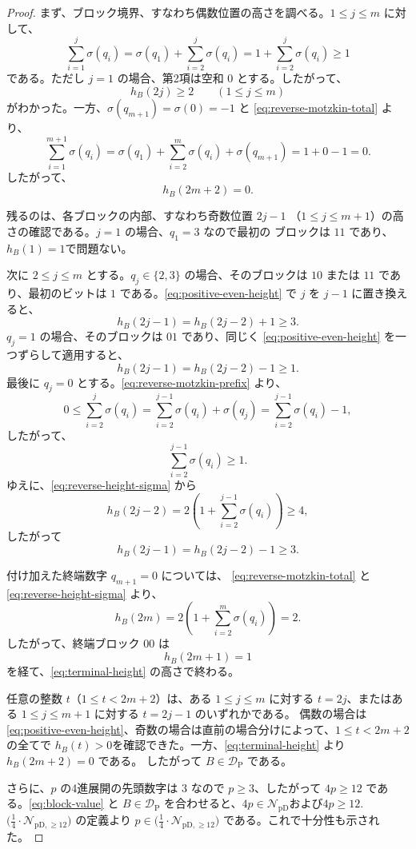 \documentclass[12pt]{ltjsarticle}
\theoremstyle{plain}
\theoremstyle{definition}
\theoremstyle{plain}
\newcommand{\NpD}{\mathcal{N}_{\mathrm{pD}}}
\newcommand{\DP}{\mathcal{D}_{\mathrm{P}}}
\newcommand{\Pset}{%
  \bigl(\tfrac{1}{4}\cdot\mathcal{N}_{\mathrm{pD},\geq 12}\bigr)%
}
\begin{document}
\begin{proof}
まず、ブロック境界、すなわち偶数位置の高さを調べる。$1\leq j\leq m$ に対して、
\[
 \sum_{i=1}^{j}\sigma(q_i)
 = \sigma(q_1)+\sum_{i=2}^{j}\sigma(q_i)
=1+\sum_{i=2}^{j}\sigma(q_i)
 \geq1
\]
である。ただし $j=1$ の場合、第2項は空和 $0$ とする。したがって、
\begin{equation}\label{eq:positive-even-height}
 h_B(2j)\geq2
 \qquad(1\leq j\leq m)
\end{equation}
がわかった。一方、$\sigma(q_{m+1})=\sigma(0)=-1$ と
\eqref{eq:reverse-motzkin-total} より、
\[
 \sum_{i=1}^{m+1}\sigma(q_i)
 = \sigma(q_1)+\sum_{i=2}^{m}\sigma(q_i)+\sigma(q_{m+1})
 =1+0-1=0.
\]
したがって、
\begin{equation}\label{eq:terminal-height}
 h_B(2m+2)=0.
\end{equation}

残るのは、各ブロックの内部、すなわち奇数位置 $2j-1$
（$1\leq j\leq m+1$）の高さの確認である。$j=1$ の場合、$q_1=3$ なので最初の
ブロックは $11$ であり、$ h_B(1)=1$で問題ない。

次に $2\leq j\leq m$ とする。$q_j\in\{2,3\}$ の場合、そのブロックは $10$ または
$11$ であり、最初のビットは $1$ である。\eqref{eq:positive-even-height} で $j$ を
$j-1$ に置き換えると、
\[
 h_B(2j-1)=h_B(2j-2)+1\geq3.
\]
$q_j=1$ の場合、そのブロックは $01$ であり、同じく
\eqref{eq:positive-even-height} を一つずらして適用すると、
\[
 h_B(2j-1)=h_B(2j-2)-1\geq1.
\]
最後に $q_j=0$ とする。\eqref{eq:reverse-motzkin-prefix} より、
\[
 0\leq\sum_{i=2}^{j}\sigma(q_i)
 =\sum_{i=2}^{j-1}\sigma(q_i)+\sigma(q_j)=\sum_{i=2}^{j-1}\sigma(q_i)-1,
\]
したがって、
\[
 \sum_{i=2}^{j-1}\sigma(q_i)\geq1.
\]
ゆえに、\eqref{eq:reverse-height-sigma} から
\[
 h_B(2j-2)
 =2\left(1+\sum_{i=2}^{j-1}\sigma(q_i)\right)
 \geq4,
\]
したがって
\[
 h_B(2j-1)=h_B(2j-2)-1\geq3.
\]

付け加えた終端数字 $q_{m+1}=0$ については、
\eqref{eq:reverse-motzkin-total} と \eqref{eq:reverse-height-sigma} より、
\[
 h_B(2m)=2\left(1+\sum_{i=2}^{m}\sigma(q_i)\right)=2.
\]
したがって、終端ブロック $00$ は
\[
 h_B(2m+1)=1
\]
を経て、\eqref{eq:terminal-height} の高さで終わる。

任意の整数 $t$（$1\leq t<2m+2$）は、ある $1\leq j\leq m$ に対する
$t=2j$、またはある $1\leq j\leq m+1$ に対する $t=2j-1$ のいずれかである。
偶数の場合は \eqref{eq:positive-even-height}、奇数の場合は直前の場合分けによって、$1\leq t<2m+2$の全てで
$ h_B(t)>0$を確認できた。一方、\eqref{eq:terminal-height} より $h_B(2m+2)=0$ である。
したがって $B\in\DP$ である。

さらに、$p$ の4進展開の先頭数字は $3$ なので $p\geq3$、したがって
$4p\geq12$ である。\eqref{eq:block-value} と $B\in\DP$ を合わせると、$ 4p\in\NpD$および$4p\geq12$.
$\Pset$ の定義より $p\in\Pset$ である。これで十分性も示された。
\end{proof}
\end{document}
